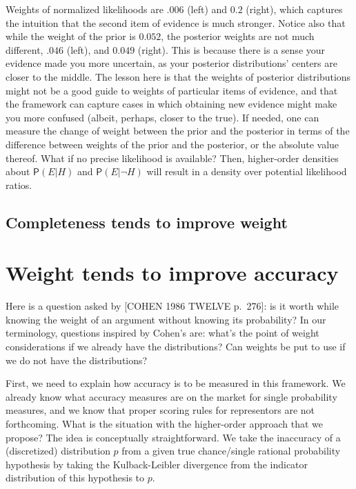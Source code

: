 \documentclass[
  10pt,
  dvipsnames,enabledeprecatedfontcommands]{scrartcl}
\newcommand{\n}{\neg}
\newcommand{\pr}[1]{\mathsf{P}(#1)}
\begin{document}
Weights of normalized likelihoods are \(.006\) (left) and \(0.2\)
(right), which captures the intuition that the second item of evidence
is much stronger. Notice also that while the weight of the prior is
\(0.052\), the posterior weights are not much different, \(.046\)
(left), and \(0.049\) (right). This is because there is a sense your
evidence made you more uncertain, as your posterior distributions'
centers are closer to the middle. The lesson here is that the weights of
posterior distributions might not be a good guide to weights of
particular items of evidence, and that the framework can capture cases
in which obtaining new evidence might make you more confused (albeit,
perhaps, closer to the true). If needed, one can measure the change of
weight between the prior and the posterior in terms of the difference
between weights of the prior and the posterior, or the absolute value
thereof. What if no precise likelihood is available? Then, higher-order
densities about \(\pr{E \vert H}\) and \(\pr{E\vert \n H}\) will result
in a density over potential likelihood ratios.

\hypertarget{completeness-tends-to-improve-weight}{%
\subsection{Completeness tends to improve
weight}\label{completeness-tends-to-improve-weight}}

\hypertarget{weight-tends-to-improve-accuracy}{%
\section{Weight tends to improve
accuracy}\label{weight-tends-to-improve-accuracy}}

Here is a question asked by {[}COHEN 1986 TWELVE p.~276{]}: is it worth
while knowing the weight of an argument without knowing its probability?
In our terminology, questions inspired by Cohen's are: what's the point
of weight considerations if we already have the distributions? Can
weights be put to use if we do not have the distributions?

First, we need to explain how accuracy is to be measured in this
framework. We already know what accuracy measures are on the market for
single probability measures, and we know that proper scoring rules for
representors are not forthcoming. What is the situation with the
higher-order approach that we propose? The idea is conceptually
straightforward. We take the inaccuracy of a (discretized) distribution
\(p\) from a given true chance/single rational probability hypothesis by
taking the Kulback-Leibler divergence from the indicator distribution of
this hypothesis to \(p\).
\end{document}
